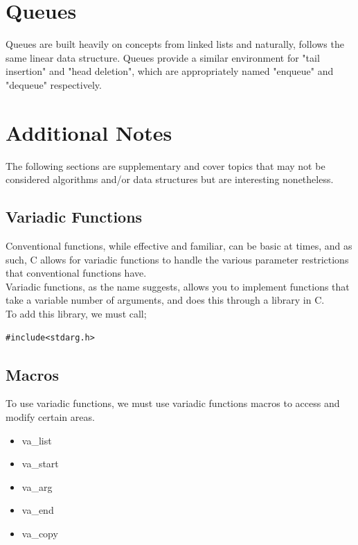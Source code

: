 \documentclass[hidelinks,11pt]{article}
\begin{document}
\section{Queues}
Queues are built heavily on concepts from linked lists and naturally, follows the same linear data structure. Queues provide a similar environment for "tail insertion" and "head deletion", which are appropriately named "enqueue" and "dequeue" respectively.
\section{Additional Notes}
The following sections are supplementary and cover topics that may not be considered algorithms and/or data structures but are interesting nonetheless.
\subsection{Variadic Functions}
Conventional functions, while effective and familiar, can be basic at times, and as such, C allows for variadic functions to handle the various parameter restrictions that conventional functions have.\\[0.5\baselineskip]
Variadic functions, as the name suggests, allows you to implement functions that take a variable number of arguments, and does this through a library in C. \\[0.5\baselineskip]
To add this library, we must call;
\begin{lstlisting}[belowskip=-1.80 \baselineskip]
    #include<stdarg.h>
\end{lstlisting}
\subsection{Macros}
To use variadic functions, we must use variadic functions macros to access and modify certain areas.
\begin{itemize}
    \item va\_list
    \item va\_start
    \item va\_arg
    \item va\_end
    \item va\_copy
\end{itemize}
\end{document}
